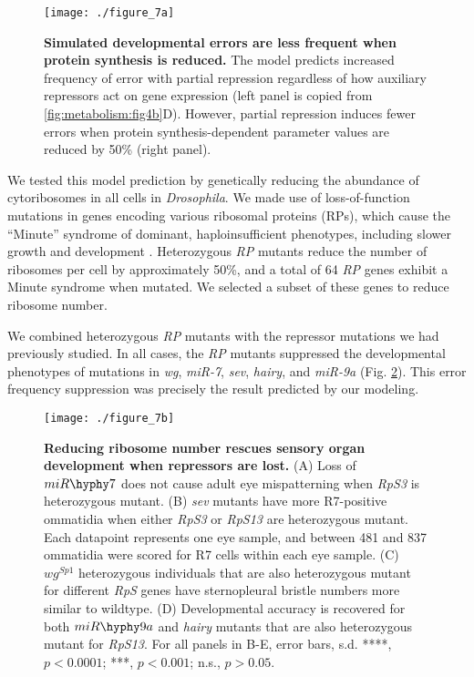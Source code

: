 \begin{figure}[h!]
\centering
\texttt{[image: ./figure\_7a]}
\caption[Simulated errors are less frequent when protein synthesis is reduced.]{\textbf{Simulated developmental errors are less frequent when protein synthesis is reduced.} The model predicts increased frequency of error with partial repression regardless of how auxiliary repressors act on gene expression (left panel is copied from \ref{fig:metabolism:fig4b}D). However, partial repression induces fewer errors when protein synthesis-dependent parameter values are reduced by 50\% (right panel).}
\label{fig:metabolism:fig7a}
\end{figure}

We tested this model prediction by genetically reducing the abundance of cytoribosomes in all cells in \textit{Drosophila}. We made use of loss-of-function mutations in genes encoding various ribosomal proteins (RPs), which cause the ``Minute'' syndrome of dominant, haploinsufficient phenotypes, including slower growth and development \cite{Marygold2007,Sæbøelarssen1998}. Heterozygous \textit{RP} mutants reduce the number of ribosomes per cell by approximately 50\%, and a total of 64 \textit{RP} genes exhibit a Minute syndrome when mutated. We selected a subset of these genes to reduce ribosome number.

We combined heterozygous \textit{RP} mutants with the repressor mutations we had previously studied. In all cases, the \textit{RP} mutants suppressed the developmental phenotypes of mutations in \textit{wg}, \textit{miR-7}, \textit{sev}, \textit{hairy}, and \textit{miR-9a} (Fig. \ref{fig:metabolism:fig7b}). This error frequency suppression was precisely the result predicted by our modeling.

\begin{figure}[h!]
\centering
\texttt{[image: ./figure\_7b]}
\caption[Reducing ribosome number rescues sensory organ development.]{\textbf{Reducing ribosome number rescues sensory organ development when repressors are lost.} (A) Loss of $miR\hyphy  7$ does not cause adult eye mispatterning when \textit{RpS3} is heterozygous mutant. (B) \textit{sev} mutants have more R7-positive ommatidia when either \textit{RpS3} or \textit{RpS13} are heterozygous mutant. Each datapoint represents one eye sample, and between 481 and 837 ommatidia were scored for R7 cells within each eye sample. (C) $wg^{Sp1}$ heterozygous individuals that are also heterozygous mutant for different \textit{RpS} genes have sternopleural bristle numbers more similar to wildtype. (D) Developmental accuracy is recovered for both $miR\hyphy 9a$ and \textit{hairy} mutants that are also heterozygous mutant for \textit{RpS13}. For all panels in B-E, error bars, s.d. ****, $p<0.0001$; ***, $p<0.001$; n.s., $p>0.05$.}
\label{fig:metabolism:fig7b}
\end{figure}

